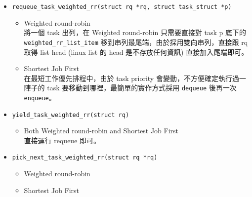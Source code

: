 \documentclass{res}
\begin{document}
\begin{resume}
\begin{itemize}
	\item
	\lstinline{requeue_task_weighted_rr(struct rq *rq, struct task_struct *p)} \\
	\begin{itemize}
		\item Weighted round-robin \\
		將一個 task 出列，在 Weighted round-robin 只需要直接對 task p 底下的 \lstinline{weighted_rr_list_item} 移到串列最尾端，由於採用雙向串列，直接跟 rq 取得 list head (linux list 的 head 是不存放任何資訊) 直接加入尾端即可。
		\item Shortest Job First \\
		在最短工作優先排程中，由於 task priority 會變動，不方便確定執行過一陣子的 task 要移動到哪裡，最簡單的實作方式採用 \lstinline{dequeue} 後再一次 \lstinline{enqueue}。
	\end{itemize}
	
	\item
	\lstinline{yield_task_weighted_rr(struct rq)} \\
	\begin{itemize}
		\item Both Weighted round-robin and Shortest Job First\\
		直接運行 requeue 即可。
	\end{itemize}
	
	\item
	\lstinline{pick_next_task_weighted_rr(struct rq *rq)}\\
	\begin{itemize}
		\item Weighted round-robin \\
		
		\item Shortest Job First\\
	\end{itemize}
\end{itemize}

\end{resume}
\end{document}
